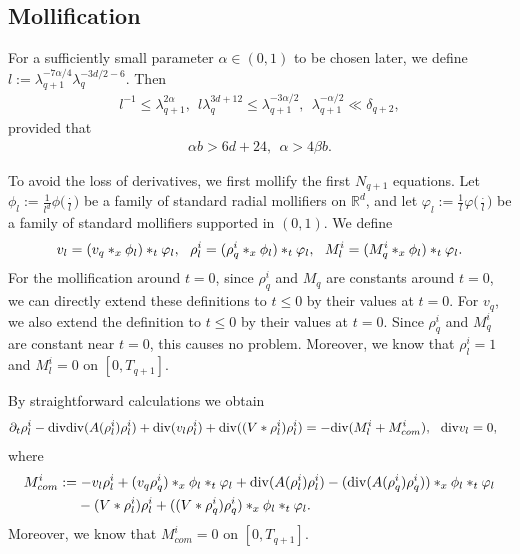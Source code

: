 \documentclass[UTF-8,reqno]{amsart}
\numberwithin{equation}{section}
\theoremstyle{definition}
\def\leq{\leqslant}
\def\div{\mathord{{\rm div}}}
\def\leq{\leqslant}
\def\div{\mathord{{\rm div}}}
\begin{document}
\subsection{Mollification}\label{sec:mpll4}
For a sufficiently small parameter $\alpha\in(0,1)$ to be chosen later, we define
$
l:=\lambda_{q+1}^{-7\alpha/4}\lambda_q^{-3d/2-6}.
$
Then
\begin{align}
l^{-1}
\leq
\lambda_{q+1}^{2\alpha},
 \ \
l\lambda_q^{3d+12}
\leq
\lambda_{q+1}^{-3\alpha/2},\ \ \lambda_{q+1}^{-\alpha/2}
\ll
\delta_{q+2},
\label{para42}
\end{align}
provided that
\begin{align}
\alpha b>6d+24,
\ \
\alpha>4\beta b.
\label{alphab>}
\end{align}

To avoid the loss of derivatives, we first mollify the first $N_{q+1}$ equations.
Let
$
\phi_l:=\frac1{l^d}\phi\bigl(\tfrac{\cdot}{l}\bigr)
$
be a family of standard radial mollifiers on $\mathbb{R}^d$, and let
$
\varphi_l:=\frac1l\varphi\bigl(\tfrac{\cdot}{l}\bigr)
$
be a family of standard mollifiers supported in $(0,1)$.
We define  
\begin{align}
v_l=(v_{q }*_x\phi_l)*_t\varphi_l,\ \ 
 \rho_l^i=(\rho_{q}^i*_x\phi_l)*_t\varphi_l,\ \ M_l^i=(M_{q }^i*_x\phi_l)*_t\varphi_l.\notag
\end{align}
  For the mollification around $t = 0$,  since $ \rho_q^i$ and $M_q$ are constants around $t = 0$, we  can directly extend these definitions  to $t\leq 0$ by their values at $t=0$. For $v_q$, we also extend the definition to $t\leq0$ by their values at $t=0$.
Since $\rho_q^i$ and $M_q^i$ are constant near $t=0$, this causes no problem.
Moreover,    we know that $ \rho_l^i=1 $ and $ M_l^i=0$ on $[0, T_{q+1}]$.
  
By straightforward calculations  we obtain 
\begin{align}
\partial_t \rho_l^i-\div\div(A(\rho_l^i)\rho_l^i)+\div(v_l \rho_l^i)+\div((V*\rho_l^i)\rho_l^i)&=-\div (M^i_l+M^i_{com}),\ \ \div v_l=0,\label{eq:4v_l}
\end{align} where
 \begin{align*}
M_{com}^i&:=-v_l \rho^i_l+(v_{q } \rho^i_{q})*_x\phi_l*_t\varphi_l+\div(A(\rho_l^i) \rho_l^i)-(\div(A(\rho_q^i) \rho_q^i))*_x\phi_l*_t\varphi_l\\
&\ \ \ \   -(V*\rho_l^i)\rho_l^i+((V*\rho_q^i)\rho_q^i)*_x\phi_l*_t\varphi_l.
\end{align*} 
 Moreover,    we know that   $ M_{com}^i=0$ on $[0, T_{q+1}]$.
\end{document}
